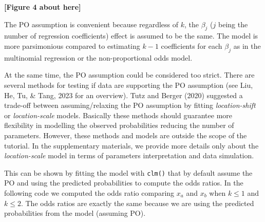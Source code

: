 \documentclass[
  man,floatsintext]{apa6}
\begin{document}
\begin{center}\textbf{[Figure 4 about here]} \end{center}

\normalsize

The PO assumption is convenient because regardless of \(k\), the \(\beta_j\) (\(j\) being the number of regression coefficients) effect is assumed to be the same. The model is more parsimonious compared to estimating \(k - 1\) coefficients for each \(\beta_j\) as in the multinomial regression or the non-proportional odds model.

At the same time, the PO assumption could be considered too strict. There are several methods for testing if data are supporting the PO assumption (see Liu, He, Tu, \& Tang, 2023 for an overview). Tutz and Berger (2020) suggested a trade-off between assuming/relaxing the PO assumption by fitting \emph{location-shift} or \emph{location-scale} models. Basically these methods should guarantee more flexibility in modelling the observed probabilities reducing the number of parameters. However, these methods and models are outside the scope of the tutorial. In the supplementary materials, we provide more details only about the \emph{location-scale} model in terms of parameters interpretation and data simulation.

This can be shown by fitting the model with \texttt{clm()} that by default assume the PO and using the predicted probabilities to compute the odds ratios. In the following code we computed the odds ratio comparing \(x_a\) and \(x_b\) when \(k \leq 1\) and \(k \leq 2\). The odds ratios are exactly the same because we are using the predicted probabilities from the model (assuming PO).

\scriptsize
\end{document}
